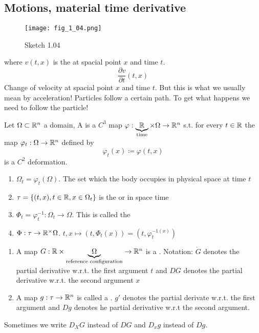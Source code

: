\subsection{Motions, material time derivative}


\begin{figure}[H]\label{fig:1.04}
    \centering
    \texttt{[image: fig\_1\_04.png]}
    \caption{Sketch 1.04}
\end{figure}
where \(v(t,x)\) is the  at spacial point \(x\) and time \(t\).
\[\frac{\partial v}{\partial t}(t,x)\]
Change of velocity at spacial point \(x\) and time \(t\). But this is  what we usually mean by acceleration!
Particles follow a certain path. To get what happens we need to follow the particle!

\begin{definition}\label{def:1.12}
    Let \(\Omega\subset\mathbb{R}^n\) a domain, A  is a \(C^3\) map \(\varphi:\underbrace{\mathbb{R}}_{\text{time}}\times \Omega\to\mathbb{R}^n\) s.t. 
    for every \(t\in\mathbb{R}\) the map \(\varphi_t:\Omega\to\mathbb{R}^n\) defined by \[\varphi_t(x)\coloneqq \varphi(t,x)\]
    is a \(C^2\) deformation.

    \begin{enumerate}
        \item \(\Omega_t=\varphi_t(\Omega)\). The set which the body occupies in physical space at time \(t\)
        \item \(\tau=\{(t,x),t\in \mathbb{R},x\in\Omega_t\}\) is the  or  in space time %
        \item \(\Phi_t=\varphi_t^{-1}:\Omega_t\to\Omega\). This is called the 
        \item \(\Phi:\tau\to\mathbb{R}^\times\Omega\). \(t,x\mapsto (t,\Phi_t(x))=(t,\varphi_t^{-1(x)})\)
    \end{enumerate}

\end{definition}

\begin{definition}\label{def:1.13}
    \begin{enumerate}
        \item A map \(G:\mathbb{R} \times \underbrace{\Omega}_{\text{reference configuration}}\to\mathbb{R}^n\) is a . Notation:
        \(\dot{G}\) denotes the partial derivative w.r.t. the first argument \(t\) and \(DG\) denotes the partial derivative w.r.t. the second argument \(x\)
        \item A map \(g:\tau\to\mathbb{R}^n\) is called a . \(g'\) denotes the partial derivate w.r.t. the first argument and \(Dg\) denotes he partial derivative w.r.t the second argument.
    \end{enumerate}
    Sometimes we write \(D_XG\) instead of \(DG\) and \(D_xg\) instead of \(Dg\).
\end{definition}


